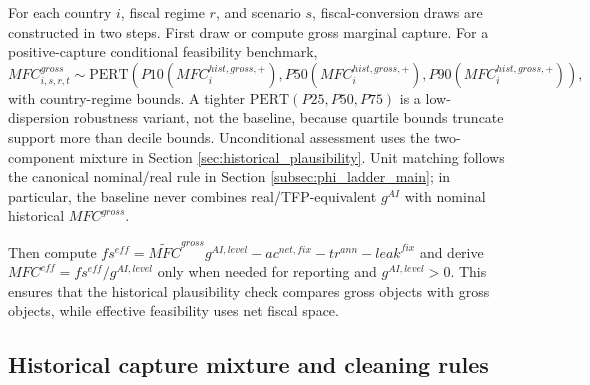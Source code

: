 \documentclass[11pt,a4paper]{article}
\begin{document}
For each country $i$, fiscal regime $r$, and scenario $s$, fiscal-conversion draws are constructed in two steps. First draw or compute gross marginal capture. For a positive-capture conditional feasibility benchmark,
\begin{equation}
    MFC^{gross}_{i,s,r,t}
    \sim \text{PERT}\left(P10(MFC^{hist,gross,+}_i),P50(MFC^{hist,gross,+}_i),P90(MFC^{hist,gross,+}_i)\right),
\end{equation}
with country-regime bounds. A tighter $\text{PERT}(P25,P50,P75)$ is a low-dispersion robustness variant, not the baseline, because quartile bounds truncate support more than decile bounds. Unconditional assessment uses the two-component mixture in Section \ref{sec:historical_plausibility}. Unit matching follows the canonical nominal/real rule in Section \ref{subsec:phi_ladder_main}; in particular, the baseline never combines real/TFP-equivalent $g^{AI}$ with nominal historical $MFC^{gross}$.

Then compute $fs^{eff}=\widetilde{MFC}^{gross}g^{AI,level}-ac^{net,fix}-tr^{ann}-leak^{fix}$ and derive $MFC^{eff}=fs^{eff}/g^{AI,level}$ only when needed for reporting and $g^{AI,level}>0$. This ensures that the historical plausibility check compares gross objects with gross objects, while effective feasibility uses net fiscal space.



\subsection{Historical capture mixture and cleaning rules}
\end{document}
